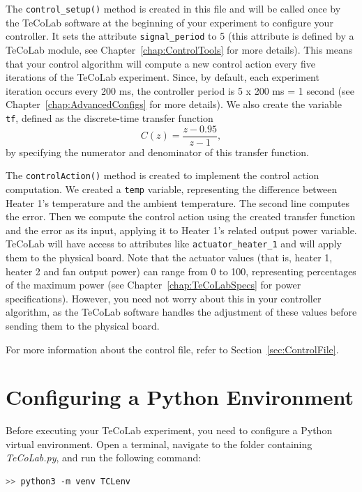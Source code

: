 \documentclass[12pt]{report}
\begin{document}
The \texttt{control\_setup()} method is created in this file and will be called once by the TeCoLab software at the beginning of your experiment to configure your controller. It sets the attribute \texttt{signal\_period} to 5 (this attribute is defined by a TeCoLab module, see Chapter~\ref{chap:ControlTools} for more details). This means that your control algorithm will compute a new control action every five iterations of the TeCoLab experiment. Since, by default, each experiment iteration occurs every 200 ms, the controller period is 5 x 200 ms = 1 second (see Chapter~\ref{chap:AdvancedConfigs} for more details). We also create the variable \texttt{tf}, defined as the discrete-time transfer function
\begin{equation*}
C(z) = \frac{z - 0.95}{z - 1},
\end{equation*}
by specifying the numerator and denominator of this transfer function.

The \texttt{controlAction()} method is created to implement the control action computation. We created a \texttt{temp} variable, representing the difference between Heater 1's temperature and the ambient temperature. The second line computes the error. Then we compute the control action using the created transfer function and the error as its input, applying it to Heater 1's related output power variable. TeCoLab will have access to attributes like \texttt{actuator\_heater\_1} and will apply them to the physical board. Note that the actuator values (that is, heater 1, heater 2 and fan output power) can range from 0 to 100, representing percentages of the maximum power (see Chapter~\ref{chap:TeCoLabSpecs} for power specifications). However, you need not worry about this in your controller algorithm, as the TeCoLab software handles the adjustment of these values before sending them to the physical board.

For more information about the control file, refer to Section~\ref{sec:ControlFile}.

\section{Configuring a Python Environment}\label{sec:dependencies}

Before executing your TeCoLab experiment, you need to configure a Python virtual environment. Open a terminal, navigate to the folder containing \emph{TeCoLab.py}, and run the following command:

\begin{lstlisting}[language=bash]
>> python3 -m venv TCLenv
\end{lstlisting}
\end{document}
